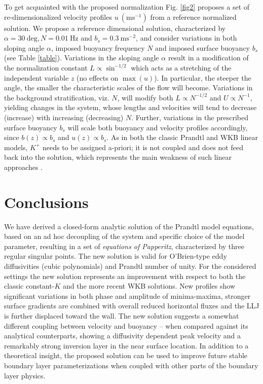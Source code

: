 %
To get acquainted with the proposed normalization Fig. \ref{fig2} proposes a set of re-dimensionalized velocity profiles $u \ \mathrm{(ms^{-1})}$ from a reference normalized solution.
We propose a reference dimensional solution, characterized by $\alpha = 30 \ \mathrm{deg}, N = 0.01 \ \mathrm{Hz}$ and $b_s = 0.3  \ \mathrm{ms^{-2}}$, and consider variations in both sloping angle $\alpha$, imposed buoyancy frequency $N$ and imposed surface buoyancy $b_s$ (see Table \ref{table}).
Variations in the sloping angle $\alpha$ result in a modification of the normalization constant $L \propto \sin^{-1/2}$ which acts as a stretching of the independent variable $z$ (no effects on $\max{(u)}$). 
In particular, the steeper the angle, the smaller the characteristic scales of the flow will become.
Variations in the background stratification, viz. $N$, will modify both $L \propto N^{-1/2}$ and $U \propto N^{-1}$, yielding changes in the system, whose lengths and velocities will tend to decrease (increase) with increasing (decreasing) $N$.
Further, variations in the prescribed surface buoyancy $b_s$ will scale both buoyancy and velocity profiles accordingly, since $b(z) \propto b_s$ and $u(z) \propto b_s$.
As in both the classic Prandtl and WKB linear models, $K^+$ needs to be assigned a-priori; it is not coupled and does not feed back into the solution, which represents the main weakness of such linear approaches \citep{grisogono2001katabatic}.


\section{Conclusions}
%
We have derived a closed-form analytic solution of the Prandtl model equations, based on an ad hoc decoupling of the system and specific choice of the model parameter, resulting in a set of \textit{equations of Papperitz}, characterized by three regular singular points. 
The new solution is valid for O'Brien-type eddy diffusivities (cubic polynomials) and Prandtl number of unity. 
For the considered settings the new solution represents an improvement with respect to both the classic constant-$K$ and the more recent WKB solutions. 
New profiles show significant variations in both phase and amplitude of minima-maxima, stronger surface gradients are combined with overall reduced horizontal fluxes and the LLJ is further displaced toward the wall.
The new solution suggests a somewhat different coupling between velocity and buoyancy -- when compared against its analytical counterparts, showing a diffusivity dependent peak velocity and a remarkably strong inversion layer in the near surface location.
In addition to a theoretical insight, the proposed solution can be used to improve future stable boundary layer parameterizations when coupled with other parts of the boundary layer physics.


